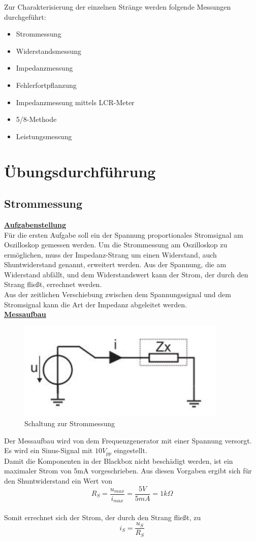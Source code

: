 \documentclass[a4paper,12pt]{article}
\begin{document}
	\newline
	Zur Charakterisierung der einzelnen Stränge werden folgende Messungen durchgeführt:
	\begin{itemize}
		\item Strommessung
		\item Widerstandsmessung
		\item Impedanzmessung
		\item Fehlerfortpflanzung
		\item Impedanzmessung mittels LCR-Meter
		\item 5/8-Methode
		\item Leistungsmessung
	\end{itemize}
	\newpage
	\section{Übungsdurchführung}
	\subsection{Strommessung}
	\underline{\textbf{Aufgabenstellung}} \\ \newline
	\noindent
	Für die ersten Aufgabe soll ein der Spannung proportionales Stromsignal am Oszilloskop gemessen werden. Um die Strommessung am Oszilloskop zu ermöglichen, muss der Impedanz-Strang um einen Widerstand, auch Shuntwiderstand genannt, erweitert werden. Aus der Spannung, die am Widerstand abfällt, und dem Widerstandswert kann der Strom, der durch den Strang fließt, errechnet werden.\\
	Aus der zeitlichen Verschiebung zwischen dem Spannungssignal und dem Stromsignal kann die Art der Impedanz abgeleitet werden.
	\\ \newline
	\noindent
	\underline{\textbf{Messaufbau}} \\
	\begin{figure}[h]
		\centering
		\includegraphics[width=10cm]{assets/strommessung}
		\caption{Schaltung zur Strommessung}
	\end{figure}
	\newline
	Der Messaufbau wird von dem Frequenzgenerator mit einer Spannung versorgt. Es wird ein Sinus-Signal mit \(10V_{pp}\) eingestellt.\\ Damit die Komponenten in der Blackbox nicht beschädigt werden, ist ein maximaler Strom von 5mA vorgeschrieben. Aus diesen Vorgaben ergibt sich für den Shuntwiderstand ein Wert von \[
	R_S = \frac{u_{max}}{i_{max}} = \frac{5V}{5mA} = 1k\Omega
	\]
	\\ \newline
	Somit errechnet sich der Strom, der durch den Strang fließt, zu \[
	i_S = \frac{u_S}{R_S}
	\]
	\newpage
\end{document}

